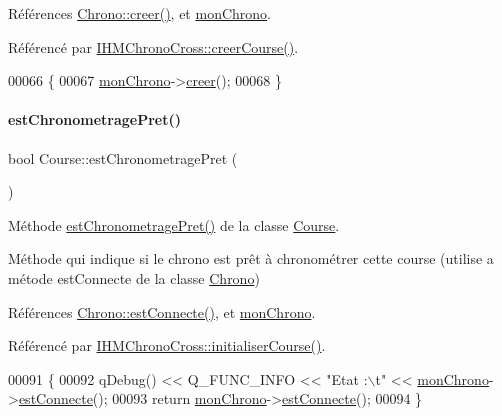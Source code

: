 Références \hyperlink{class_chrono_a74d85a4e856e2e59afacaa061feb7b75}{Chrono\+::creer()}, et \hyperlink{class_course_a0c9b246b0f1ec612bd6e6c613a94d52b}{mon\+Chrono}.



Référencé par \hyperlink{class_i_h_m_chrono_cross_a3fc01e539c59645e0655e56e440f4b83}{I\+H\+M\+Chrono\+Cross\+::creer\+Course()}.


\begin{DoxyCode}
00066 \{
00067     \hyperlink{class_course_a0c9b246b0f1ec612bd6e6c613a94d52b}{monChrono}->\hyperlink{class_chrono_a74d85a4e856e2e59afacaa061feb7b75}{creer}();
00068 \}
\end{DoxyCode}
\mbox{\label{class_course_a44a14d431bd64a507f2c2aa5f465b1b0}} 
\paragraph{\texorpdfstring{est\+Chronometrage\+Pret()}{estChronometragePret()}}
{\footnotesize\ttfamily bool Course\+::est\+Chronometrage\+Pret (\begin{DoxyParamCaption}{ }\end{DoxyParamCaption})}



Méthode \hyperlink{class_course_a44a14d431bd64a507f2c2aa5f465b1b0}{est\+Chronometrage\+Pret()} de la classe \hyperlink{class_course}{Course}. 

Méthode qui indique si le chrono est prêt à chronométrer cette course (utilise a métode est\+Connecte de la classe \hyperlink{class_chrono}{Chrono}) 

Références \hyperlink{class_chrono_aaad6d9079f2de1c09092f97614009f62}{Chrono\+::est\+Connecte()}, et \hyperlink{class_course_a0c9b246b0f1ec612bd6e6c613a94d52b}{mon\+Chrono}.



Référencé par \hyperlink{class_i_h_m_chrono_cross_adde019cc3799befac3fd9555e392eab9}{I\+H\+M\+Chrono\+Cross\+::initialiser\+Course()}.


\begin{DoxyCode}
00091 \{
00092     qDebug() << Q\_FUNC\_INFO << \textcolor{stringliteral}{"Etat :\(\backslash\)t"} << \hyperlink{class_course_a0c9b246b0f1ec612bd6e6c613a94d52b}{monChrono}->\hyperlink{class_chrono_aaad6d9079f2de1c09092f97614009f62}{estConnecte}();
00093     \textcolor{keywordflow}{return} \hyperlink{class_course_a0c9b246b0f1ec612bd6e6c613a94d52b}{monChrono}->\hyperlink{class_chrono_aaad6d9079f2de1c09092f97614009f62}{estConnecte}();
00094 \}
\end{DoxyCode}
\mbox{\label{class_course_abbcfaecd40b5ec5e47419068423e767f}} 
